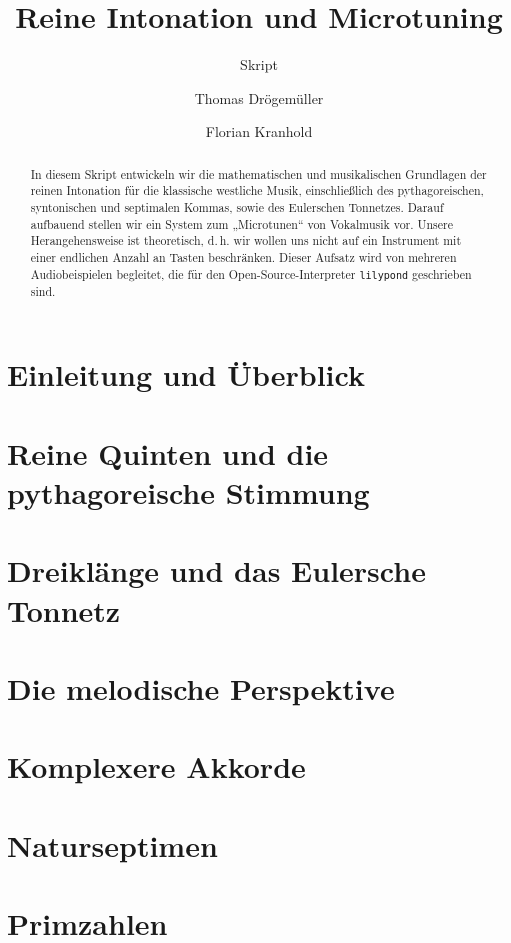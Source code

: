 \documentclass[ngerman,11pt]{scrartcl}
\title     {Reine Intonation und Microtuning}
\author    {Thomas Drögemüller\and Florian Kranhold}
\subtitle  {Skript}
\begin{document}
\maketitle

\begin{abstract}
  In diesem Skript entwickeln wir die mathematischen und musikalischen
  Grundlagen der reinen Intonation für die klassische westliche Musik,
  einschließlich des pythagoreischen, syntonischen und septimalen Kommas, sowie
  des Eulerschen Tonnetzes. Darauf aufbauend stellen wir ein System zum
  „Microtunen“ von Vokalmusik vor. Unsere Herangehensweise ist theoretisch,
  d.\,h. wir wollen uns nicht auf ein Instrument mit einer endlichen Anzahl an
  Tasten beschränken. Dieser Aufsatz wird von mehreren Audiobeispielen
  begleitet, die für den Open-Source-Interpreter \texttt{lilypond} geschrieben
  sind.
\end{abstract}

\section{Einleitung und Überblick}
\label{sec:int}


\section{Reine Quinten und die pythagoreische Stimmung}
\label{sec:pyth}


\section{Dreiklänge und das Eulersche Tonnetz}
\label{sec:tri}


\section{Die melodische Perspektive}
\label{sec:melody}


\section{Komplexere Akkorde}
\label{sec:quad}


\section{Naturseptimen}
\label{sec:sept}



\appendix
\section{Primzahlen}
\label{sec:primes}


\printbibliography[heading=bibintoc]
\end{document}
